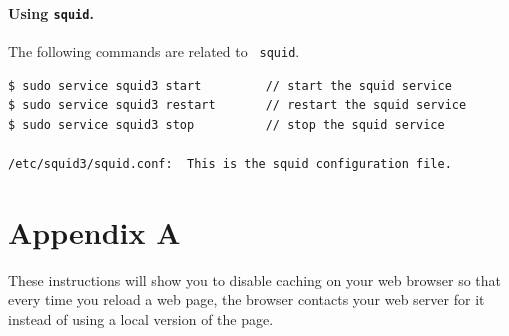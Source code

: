 \paragraph{Using {\tt squid}.} The following commands are related to {\tt
squid}.
\begin{Verbatim}[frame=single]
$ sudo service squid3 start         // start the squid service
$ sudo service squid3 restart       // restart the squid service
$ sudo service squid3 stop          // stop the squid service

/etc/squid3/squid.conf:  This is the squid configuration file. 
\end{Verbatim}
\fi

\newpage
\section{Appendix A}
These instructions will show you to disable caching on your web browser so that every time you reload a web page, the browser contacts your web server for it instead of using a local version of the page.  

